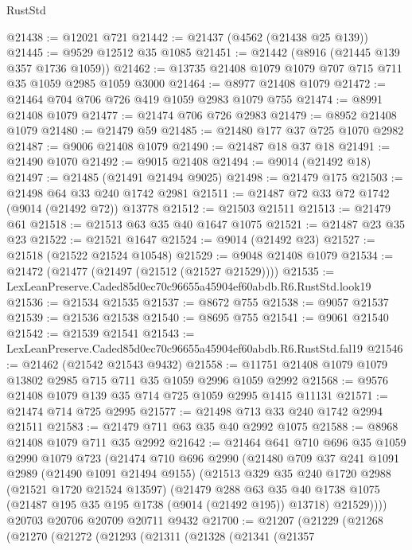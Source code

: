 \begin{lexlean}{RustStd}
\begin{coremodule}
@21438 := @12021 @721
@21442 := @21437 (@4562 (@21438 @25 @139))
@21445 := @9529 @12512 @35 @1085
@21451 := @21442 (@8916 (@21445 @139 @357 @1736 @1059))
@21462 := @13735 @21408 @1079 @1079 @707 @715 @711 @35 @1059 @2985 @1059 @3000
@21464 := @8977 @21408 @1079
@21472 := @21464 @704 @706 @726 @419 @1059 @2983 @1079 @755
@21474 := @8991 @21408 @1079
@21477 := @21474 @706 @726 @2983
@21479 := @8952 @21408 @1079
@21480 := @21479 @59
@21485 := @21480 @177 @37 @725 @1070 @2982
@21487 := @9006 @21408 @1079
@21490 := @21487 @18 @37 @18
@21491 := @21490 @1070
@21492 := @9015 @21408
@21494 := @9014 (@21492 @18)
@21497 := @21485 (@21491 @21494 @9025)
@21498 := @21479 @175
@21503 := @21498 @64 @33 @240 @1742 @2981
@21511 := @21487 @72 @33 @72 @1742 (@9014 (@21492 @72)) @13778
@21512 := @21503 @21511
@21513 := @21479 @61
@21518 := @21513 @63 @35 @40 @1647 @1075
@21521 := @21487 @23 @35 @23
@21522 := @21521 @1647
@21524 := @9014 (@21492 @23)
@21527 := @21518 (@21522 @21524 @10548)
@21529 := @9048 @21408 @1079
@21534 := @21472 (@21477 (@21497 (@21512 (@21527 @21529))))
@21535 := LexLeanPreserve.Caded85d0ec70c96655a45904ef60abdb.R6.RustStd.look19
@21536 := @21534 @21535
@21537 := @8672 @755
@21538 := @9057 @21537
@21539 := @21536 @21538
@21540 := @8695 @755
@21541 := @9061 @21540
@21542 := @21539 @21541
@21543 := LexLeanPreserve.Caded85d0ec70c96655a45904ef60abdb.R6.RustStd.fal19
@21546 := @21462 (@21542 @21543 @9432)
@21558 := @11751 @21408 @1079 @1079 @13802 @2985 @715 @711 @35 @1059 @2996 @1059 @2992
@21568 := @9576 @21408 @1079 @139 @35 @714 @725 @1059 @2995 @1415 @11131
@21571 := @21474 @714 @725 @2995
@21577 := @21498 @713 @33 @240 @1742 @2994 @21511
@21583 := @21479 @711 @63 @35 @40 @2992 @1075
@21588 := @8968 @21408 @1079 @711 @35 @2992
@21642 := @21464
    @641
    @710
    @696
    @35
    @1059
    @2990
    @1079
    @723
    (@21474
      @710
      @696
      @2990
      (@21480
        @709
        @37
        @241
        @1091
        @2989
        (@21490 @1091 @21494 @9155)
        (@21513
          @329
          @35
          @240
          @1720
          @2988
          (@21521 @1720 @21524 @13597)
          (@21479
            @288
            @63
            @35
            @40
            @1738
            @1075
            (@21487 @195 @35 @195 @1738 (@9014 (@21492 @195)) @13718)
            @21529))))
    @20703
    @20706
    @20709
    @20711
    @9432
@21700 := @21207
    (@21229
      (@21268
        (@21270
          (@21272
            (@21293
              (@21311
                (@21328
                  (@21341
                    (@21357

\end{coremodule}
\end{lexlean}
